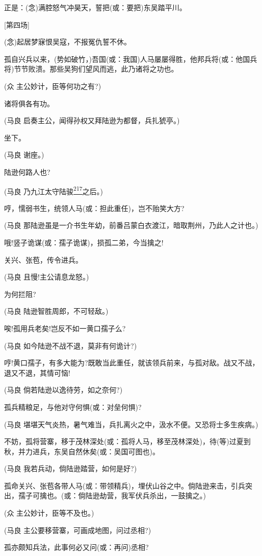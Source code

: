 正是：(念)满腔怒气冲昊天，誓把(或：要把)东吴踏平川。

{[}第四场{]}

(念)起居梦寐恨吴寇，不报冤仇誓不休。

孤自兴兵以来，(势如破竹，)吾国(或：我国)人马屡屡得胜，他邦兵将(或：他国兵将)节节败溃。那些吴狗们望风而逃，此乃诸将之功也。

(众 主公妙计，臣等何功之有?)

诸将俱各有功。

(马良 启奏主公，闻得孙权又拜陆逊为都督，兵扎猇亭。)

坐下。

(马良 谢座。)

陆逊何路人也?

(马良
乃九江太守陆骏\protect\hyperlink{fn217}{\textsuperscript{217}}之后。)

哼，懦弱书生，统领人马(或：担此重任)，岂不贻笑大方?

(马良
那陆逊虽是一介书生年幼，前番吕蒙白衣渡江，暗取荆州，乃此人之计也。)

哦!竖子诡谋(或：孺子诡谋)，损孤二弟，今当擒之!

关兴、张苞，传令进兵。

(马良 且慢!主公请息龙怒。)

为何拦阻?

(马良 陆逊智胜周郎，不可轻敌。)

唉!孤用兵老矣!岂反不如一黄口孺子么?

(马良 如今陆逊不战不退，莫非有何诡计?)

哼!黄口孺子，有多大能为?既敢当此重任，就该领兵前来，与孤对敌。战又不战，退又不退，其情可恼!

(马良 倘若陆逊以逸待劳，如之奈何?)

孤兵精粮足，与他对守何惧(或：对垒何惧)?

(马良
堪堪天气炎热，暑气难当，兵扎离火之中，汲水不便。又恐将士多生疾病。)

不妨，孤将营寨，移于茂林深处(或：孤将人马，移至茂林深处)，待(等)过夏到秋，并力进兵，东吴自然休矣(或：吴国可图也)。

(马良 我若兵动，倘陆逊踏营，如何是好?)

孤命关兴、张苞各带人马(或：带领精兵)，埋伏山谷之中。倘陆逊来击，引兵突出，孺子可擒也。(或：倘陆逊劫营，我军伏兵杀出，一鼓擒之。)

(众 主公妙计，臣等不及也。)

(马良 主公要移营寨，可画成地图，问过丞相?)

孤亦颇知兵法，此事何必又问(或：再问)丞相?

